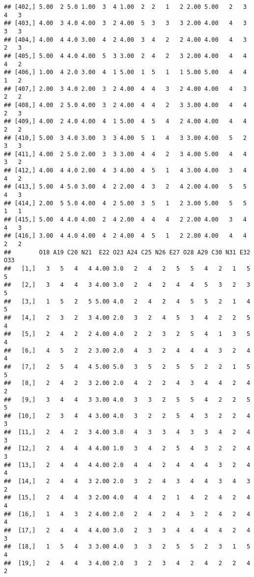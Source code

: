 \documentclass[]{article}
\begin{document}
\begin{verbatim}
## [402,] 5.00  2 5.0 1.00  3  4 1.00  2  2   1   2 2.00 5.00   2   3   4   3
## [403,] 4.00  3 4.0 4.00  3  2 4.00  5  3   3   3 2.00 4.00   4   3   3   3
## [404,] 4.00  4 4.0 3.00  4  2 4.00  3  4   2   2 4.00 4.00   4   3   2   3
## [405,] 5.00  4 4.0 4.00  5  3 3.00  2  4   2   3 2.00 4.00   4   4   4   2
## [406,] 1.00  4 2.0 3.00  4  1 5.00  1  5   1   1 5.00 5.00   4   4   1   2
## [407,] 2.00  3 4.0 2.00  3  2 4.00  4  4   3   2 4.00 4.00   4   3   2   2
## [408,] 4.00  2 5.0 4.00  3  2 4.00  4  4   2   3 3.00 4.00   4   4   2   3
## [409,] 4.00  2 4.0 4.00  4  1 5.00  4  5   4   2 4.00 4.00   4   4   2   2
## [410,] 5.00  3 4.0 3.00  3  3 4.00  5  1   4   3 3.00 4.00   5   2   3   3
## [411,] 4.00  2 5.0 2.00  3  3 3.00  4  4   2   3 4.00 5.00   4   4   3   2
## [412,] 4.00  4 4.0 2.00  4  3 4.00  4  5   1   4 3.00 4.00   3   4   4   2
## [413,] 5.00  4 5.0 3.00  4  2 2.00  4  3   2   4 2.00 4.00   5   5   4   3
## [414,] 2.00  5 5.0 4.00  4  2 5.00  3  5   1   2 3.00 5.00   5   5   1   1
## [415,] 5.00  4 4.0 4.00  2  4 2.00  4  4   4   2 2.00 4.00   3   4   4   3
## [416,] 3.00  4 4.0 4.00  4  2 4.00  4  5   1   2 2.00 4.00   4   4   2   2
##        O18 A19 C20 N21  E22 O23 A24 C25 N26 E27 O28 A29 C30 N31 E32 O33
##   [1,]   3   5   4   4 4.00 3.0   2   4   2   5   5   4   2   1   5   5
##   [2,]   3   4   4   3 4.00 3.0   2   4   2   4   4   5   3   2   3   5
##   [3,]   1   5   2   5 5.00 4.0   2   4   2   4   5   5   2   1   4   5
##   [4,]   2   3   2   3 4.00 2.0   3   2   4   5   3   4   2   2   5   4
##   [5,]   2   4   2   2 4.00 4.0   2   2   3   2   5   4   1   3   5   4
##   [6,]   4   5   2   2 3.00 2.0   4   3   2   4   4   4   3   2   4   4
##   [7,]   2   5   4   4 5.00 5.0   3   5   2   5   5   2   2   1   5   5
##   [8,]   2   4   2   3 2.00 2.0   4   2   2   4   3   4   4   2   4   2
##   [9,]   3   4   4   3 3.00 4.0   3   3   2   5   5   4   2   2   5   5
##  [10,]   2   3   4   4 3.00 4.0   3   2   2   5   4   3   2   2   4   3
##  [11,]   2   4   2   3 4.00 3.0   4   3   3   4   3   3   4   2   4   3
##  [12,]   2   4   4   4 4.00 1.0   3   4   2   5   4   3   2   2   4   3
##  [13,]   2   4   4   4 4.00 2.0   4   4   2   4   4   4   3   2   4   4
##  [14,]   2   4   4   3 2.00 2.0   3   2   4   3   4   4   3   4   3   2
##  [15,]   2   4   4   3 2.00 4.0   4   4   2   1   4   2   4   2   4   4
##  [16,]   1   4   3   2 4.00 2.0   2   4   2   4   3   2   4   2   4   4
##  [17,]   2   4   4   4 4.00 3.0   2   3   3   4   4   4   4   2   4   3
##  [18,]   1   5   4   3 3.00 4.0   3   3   2   5   5   2   3   1   5   4
##  [19,]   2   4   4   3 4.00 2.0   3   2   3   4   2   4   2   2   4   2

\end{verbatim}
\end{document}
